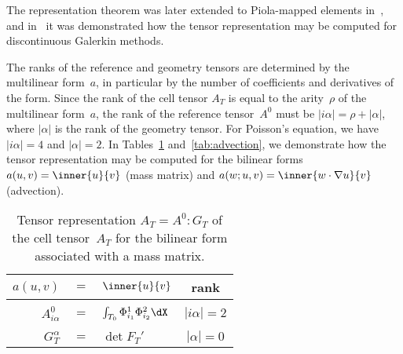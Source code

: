 The representation theorem was later extended to Piola-mapped elements
in~\cite{RognesKirbyLogg2009}, and in~\cite{OelgaardLoggWells2008}
it was demonstrated how the tensor representation may be computed for
discontinuous Galerkin methods.

The ranks of the reference and geometry tensors are determined by the
multilinear form~$a$, in particular by the number of coefficients and
derivatives of the form. Since the rank of the cell tensor $A_T$ is
equal to the arity~$\rho$ of the multilinear form~$a$, the rank of the
reference tensor~$A^0$ must be $|i\alpha| = \rho + |\alpha|$, where
$|\alpha|$ is the rank of the geometry tensor. For Poisson's equation,
we have $|i\alpha| = 4$ and $|\alpha| = 2$. In Tables~\ref{tab:mass}
and~\ref{tab:advection}, we demonstrate how the tensor representation
may be computed for the bilinear forms $a(u, v) = \inner{u}{v}$ (mass
matrix) and $a(w; u, v) = \inner{w \cdot \nabla u}{v}$ (advection).

\begin{table}
  \begin{center}
    \begin{tabular}{|rcl|c|}
      \hline
      $a(u, v)$ &$=$& $\inner{u}{v}$ & rank \\
      \hline
      \hline
      &&&\\[-2ex]
      $A^0_{i\alpha}$ &$=$& $\int_{T_0} \Phi_{i_1}^{1} \Phi_{i_2}^{2} \dX$
      & $|i\alpha| = 2$ \\[1ex]
      \hline
      &&&\\[-2ex]
      $G_T^{\alpha}$ &$=$& $\det F_T'$
      & $|\alpha| = 0$ \\[1ex]
      \hline
    \end{tabular}
    \caption{Tensor representation $A_T = A^0 : G_T$ of the cell
      tensor~$A_T$ for the bilinear form associated with a mass
      matrix.}
    \label{tab:mass}
  \end{center}
\end{table}

